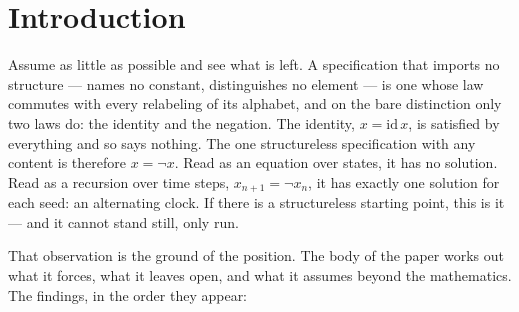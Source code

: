 \documentclass[11pt]{article}
\theoremstyle{remark}
\begin{document}
\section{Introduction}

Assume as little as possible and see what is left. A specification that imports no structure --- names no constant, distinguishes no element --- is one whose law commutes with every relabeling of its alphabet, and on the bare distinction only two laws do: the identity and the negation. The identity, $x = \mathrm{id}\,x$, is satisfied by everything and so says nothing. The one structureless specification with any content is therefore $x = \lnot x$. Read as an equation over states, it has no solution. Read as a recursion over time steps, $x_{n+1} = \lnot x_n$, it has exactly one solution for each seed: an alternating clock. If there is a structureless starting point, this is it --- and it cannot stand still, only run.

That observation is the ground of the position. The body of the paper works out what it forces, what it leaves open, and what it assumes beyond the mathematics. The findings, in the order they appear:
\end{document}

